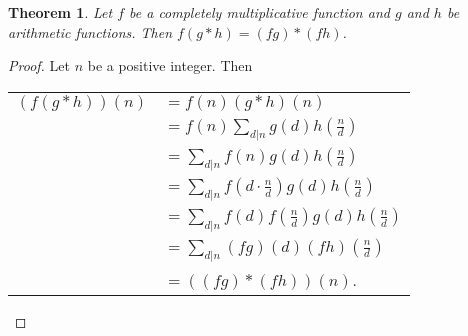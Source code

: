 \documentclass[12pt]{article}
\newtheorem*{thm*}{Theorem}
\begin{document}
\begin{thm*}
Let $f$ be a completely multiplicative function and $g$ and $h$ be arithmetic functions.  Then $f(g*h)=(fg)*(fh)$.
\end{thm*}

\begin{proof}
Let $n$ be a positive integer.  Then

\begin{center}
\begin{tabular}{ll}
$\displaystyle (f(g*h))(n)$ & $\displaystyle = f(n)(g*h)(n)$ \\
& $\displaystyle = f(n) \sum_{d|n} g(d)h\left( \frac{n}{d} \right)$ \\
& $\displaystyle = \sum_{d|n} f(n)g(d)h\left( \frac{n}{d} \right)$ \\
& $\displaystyle = \sum_{d|n} f\left( d \cdot \frac{n}{d} \right) g(d)h\left( \frac{n}{d} \right)$ \\
& $\displaystyle = \sum_{d|n} f(d)f\left( \frac{n}{d} \right) g(d)h\left( \frac{n}{d} \right)$ \\
& $\displaystyle = \sum_{d|n} (fg)(d)(fh)\left( \frac{n}{d} \right)$ \\
& $\displaystyle = ((fg)*(fh))(n)$. \end{tabular}
\end{center}
\end{proof}
\end{document}
